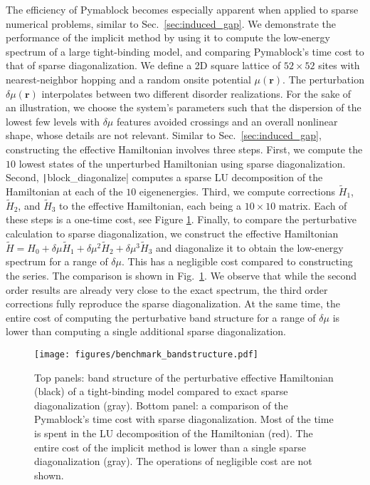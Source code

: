 The efficiency of Pymablock becomes especially apparent when applied to sparse numerical problems, similar to Sec.~\ref{sec:induced_gap}.
We demonstrate the performance of the implicit method by using it to compute the low-energy spectrum of a large tight-binding model, and comparing Pymablock's time cost to that of sparse diagonalization.
We define a 2D square lattice of $52 \times 52$ sites with nearest-neighbor hopping and a random onsite potential $\mu(\mathbf{r})$.
The perturbation $\delta \mu (\mathbf{r})$ interpolates between two different disorder realizations.
For the sake of an illustration, we choose the system's parameters such that the dispersion of the lowest few levels with $\delta \mu$ features avoided crossings and an overall nonlinear shape, whose details are not relevant.
Similar to Sec.~\ref{sec:induced_gap}, constructing the effective Hamiltonian involves three steps.
First, we compute the $10$ lowest states of the unperturbed Hamiltonian using sparse diagonalization.
Second, \texttt|block_diagonalize| computes a sparse LU decomposition of the Hamiltonian at each of the $10$ eigenenergies.
Third, we compute corrections $\tilde{H}_1$, $\tilde{H}_2$, and $\tilde{H}_3$ to the effective Hamiltonian, each being a $10 \times 10$ matrix.
Each of these steps is a one-time cost, see Figure \ref{fig:benchmark_bandstructure}.
Finally, to compare the perturbative calculation to sparse diagonalization, we construct the effective Hamiltonian $\tilde{H} = H_0 + \delta \mu \tilde{H}_1 + \delta \mu^2 \tilde{H}_2 + \delta \mu^3 \tilde{H}_3$ and diagonalize it to obtain the low-energy spectrum for a range of $\delta \mu$.
This has a negligible cost compared to constructing the series.
The comparison is shown in Fig.~\ref{fig:benchmark_bandstructure}.
We observe that while the second order results are already very close to the exact spectrum, the third order corrections fully reproduce the sparse diagonalization.
At the same time, the entire cost of computing the perturbative band structure for a range of $\delta \mu$ is lower than computing a single additional sparse diagonalization.
%
\begin{figure}[h]
    \centering
    \texttt{[image: figures/benchmark\_bandstructure.pdf]}
    \caption{
        Top panels: band structure of the perturbative effective Hamiltonian (black) of a tight-binding model compared to exact sparse diagonalization (gray).
        Bottom panel: a comparison of the Pymablock's time cost with sparse diagonalization.
        Most of the time is spent in the LU decomposition of the Hamiltonian (red).
        The entire cost of the implicit method is lower than a single sparse diagonalization (gray).
        The operations of negligible cost are not shown.
        }
    \label{fig:benchmark_bandstructure}
\end{figure}
